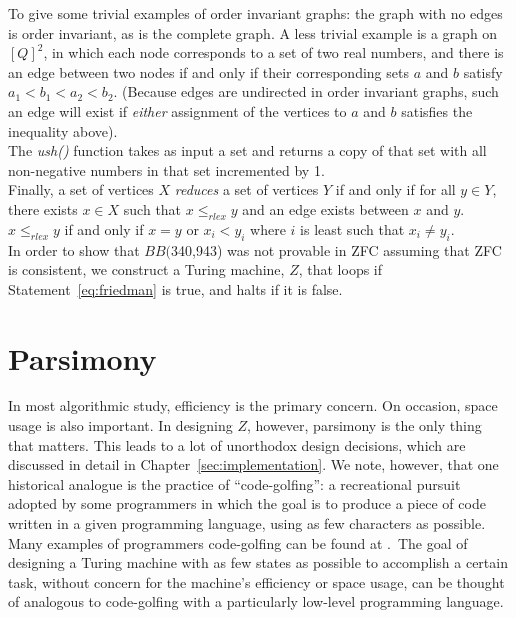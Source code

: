 \documentclass[11pt]{report}
\newcommand{\bbstatenum}{$BB($340,943) }
\begin{document}
To give some trivial examples of order invariant graphs: the graph with no edges is order invariant, as is the complete graph. A less trivial example is a graph on $[Q]^2$, in which each node corresponds to a set of two real numbers, and there is an edge between two nodes if and only if their corresponding sets $a$ and $b$ satisfy $a_1 < b_1 < a_2 < b_2$. (Because edges are undirected in order invariant graphs, such an edge will exist if \emph{either} assignment of the vertices to $a$ and $b$ satisfies the inequality above). \\

The \emph{ush()} function takes as input a set and returns a copy of that set with all non-negative numbers in that set incremented by 1. \\ 

Finally, a set of vertices $X$ \emph{reduces} a set of vertices $Y$ if and only if for all $y \in Y$, there exists $x \in X$ such that $x \le_{rlex} y$ and an edge exists between $x$ and $y$. $x \le_{rlex} y$ if and only if $x = y$ or $x_i < y_i$ where $i$ is least such that $x_i \not= y_i$.~\cite{personalcomm} \\

In order to show that \bbstatenum was not provable in ZFC assuming that ZFC is consistent, we construct a Turing machine, $Z$, that loops if Statement~\ref{eq:friedman} is true, and halts if it is false. 

\section{Parsimony}

In most algorithmic study, efficiency is the primary concern. On occasion, space usage is also important. In designing $Z$, however, parsimony is the only thing that matters. This leads to a lot of unorthodox design decisions, which are discussed in detail in Chapter~\ref{sec:implementation}. We note, however, that one historical analogue is the practice of ``code-golfing'': a recreational pursuit adopted by some programmers in which the goal is to produce a piece of code written in a given programming language, using as few characters as possible. Many examples of programmers code-golfing can be found at \cite{codegolf}.~The goal of designing a Turing machine with as few states as possible to accomplish a certain task, without concern for the machine's efficiency or space usage, can be thought of analogous to code-golfing with a particularly low-level programming language. \\
\end{document}
